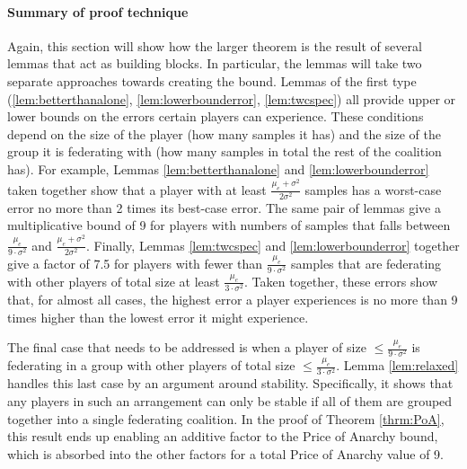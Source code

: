 \documentclass{article}
\newcommand{\cd}[0]{\cdot}
\newcommand{\mue}[0]{\ensuremath{\mu_e}}
\newcommand{\var}[0]{\ensuremath{\sigma^2}}
\begin{document}
\paragraph{\bf Summary of proof technique} Again, this section will show how the larger theorem is the result of several lemmas that act as building blocks. In particular, the lemmas will take two separate approaches towards creating the bound. Lemmas of the first type (\ref{lem:betterthanalone}, \ref{lem:lowerbounderror}, \ref{lem:twcspec}) all provide upper or lower bounds on the errors certain players can experience. These conditions depend on the size of the player (how many samples it has) and the size of the group it is federating with (how many samples in total the rest of the coalition has). For example, Lemmas \ref{lem:betterthanalone} and \ref{lem:lowerbounderror} taken together show that a player with at least $\frac{\mue+ \var}{2\var}$ samples has a worst-case error no more than 2 times its best-case error. The same pair of lemmas give a multiplicative bound of 9 for players with numbers of samples that falls between $\frac{\mue}{9\cd \var}$ and $\frac{\mue+ \var}{2\var}$. Finally, Lemmas \ref{lem:twcspec} and \ref{lem:lowerbounderror} together give a factor of 7.5 for players with fewer than $\frac{\mue}{9\cd \var}$ samples that are federating with other players of total size at least $\frac{\mue}{3\cd \var}$. Taken together, these errors show that, for almost all cases, the highest error a player experiences is no more than 9 times higher than the lowest error it might experience. 

The final case that needs to be addressed is when a player of size $\leq \frac{\mue}{9\cd \var}$ is federating in a group with other players of total size $\leq \frac{\mue}{3\cd \var}$. Lemma \ref{lem:relaxed} handles this last case by an argument around stability. Specifically, it shows that any players in such an arrangement can only be stable if all of them are grouped together into a single federating coalition. In the proof of Theorem \ref{thrm:PoA}, this result ends up enabling an additive factor to the Price of Anarchy bound, which is absorbed into the other factors for a total Price of Anarchy value of 9. 
\end{document}
